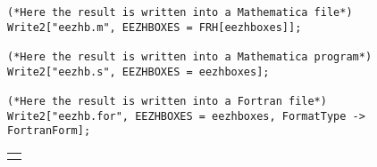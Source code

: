 \begin{figure}[H]
\begin{footnotesize}
\begin{verbatim}
(*Here the result is written into a Mathematica file*)
Write2["eezhb.m", EEZHBOXES = FRH[eezhboxes]];

(*Here the result is written into a Mathematica program*)
Write2["eezhb.s", EEZHBOXES = eezhboxes];

(*Here the result is written into a Fortran file*)
Write2["eezhb.for", EEZHBOXES = eezhboxes, FormatType -> FortranForm];

\end{verbatim}
\end{footnotesize}
\begin{tabular*}{0.8\textwidth}{c}\hhline\end{tabular*}
\end{figure}

